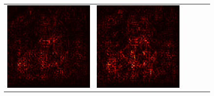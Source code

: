 \documentclass[preprint,12pt]{elsarticle}
\begin{document}
\begin{figure}[p]
\begin{tabular}{cccccc}
  \includegraphics[scale=\scale]{../visualizations/examples/imagenette/resnet18/positive_saliency_map/0.png} & 
  \includegraphics[scale=\scale]{../visualizations/examples/imagenette/resnet18/negative_saliency_map/0.png} & 

\end{tabular}
\end{figure}
\end{document}
